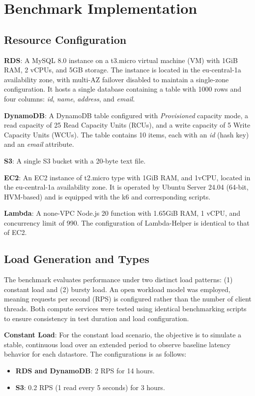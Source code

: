 \section{Benchmark Implementation}
\label{cha:implementation}

\subsection{Resource Configuration}
\label{sec:config}

\textbf{RDS}:
A MySQL 8.0 instance on a t3.micro virtual machine (VM) with 1GiB RAM, 2 vCPUs, and 5GB storage. The instance is located in the eu-central-1a availability zone, with multi-AZ failover disabled to maintain a single-zone configuration. It hosts a single database containing a table with 1000 rows and four columns: \textit{id}, \textit{name}, \textit{address}, and \textit{email}.


\textbf{DynamoDB}:
A DynamoDB table configured with \textit{Provisioned} capacity mode, a read capacity of 25 Read Capacity Units (RCUs), and a write capacity of 5 Write Capacity Units (WCUs). The table contains 10 items, each with an \textit{id} (hash key) and an \textit{email} attribute.

\textbf{S3}:
A single S3 bucket with a 20-byte text file.

\textbf{EC2}:
An EC2 instance of t2.micro type with 1GiB RAM, and 1vCPU, located in the eu-central-1a availability zone. It is operated by Ubuntu Server 24.04 (64-bit, HVM-based) and is equipped with the k6 and corresponding scripts.

\textbf{Lambda}:
A none-VPC Node.js 20 function with 1.65GiB RAM, 1 vCPU, and concurrency limit of 990. The configuration of Lambda-Helper is identical to that of EC2.

\subsection{Load Generation and Types}
\label{sec:loads}

The benchmark evaluates performance under two distinct load patterns: (1) constant load and (2) bursty load. An open workload model was employed, meaning requests per second (RPS) is configured rather than the number of client threads. Both compute services were tested using identical benchmarking scripts to ensure consistency in test duration and load configuration.

\textbf{Constant Load}: For the constant load scenario, the objective is to simulate a stable, continuous load over an extended period to observe baseline latency behavior for each datastore. The configurations is as follows:
\begin{itemize}
	\item \textbf{RDS and DynamoDB}: 2 RPS for 14 hours.
	\item \textbf{S3}: 0.2 RPS (1 read every 5 seconds) for 3 hours.
\end{itemize}

